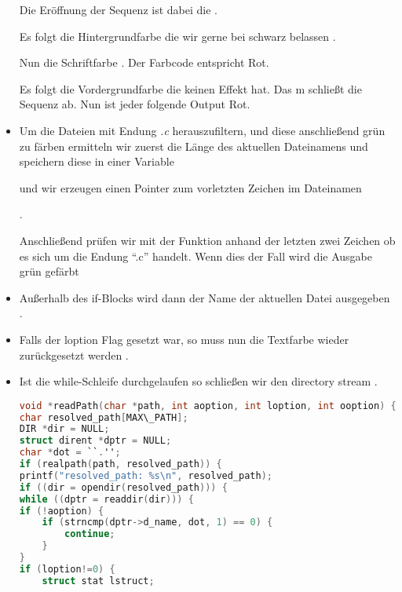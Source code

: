 \begin{itemize}
\command{printf("\\033[0;31;1m");}

Die Eröffnung der Sequenz ist dabei die \command{\\033[}.

Es folgt die Hintergrundfarbe die wir gerne bei schwarz belassen .

Nun die Schriftfarbe . Der Farbcode entspricht Rot.

Es folgt die Vordergrundfarbe  die keinen Effekt hat.
Das m schließt die Sequenz ab.
Nun ist jeder folgende Output Rot.

\item Um die Dateien mit Endung \textit{.c} herauszufiltern, und diese anschließend grün zu färben
ermitteln wir zuerst die Länge des aktuellen Dateinamens und speichern diese in einer Variable


und wir erzeugen einen Pointer zum vorletzten Zeichen im Dateinamen

.

Anschließend prüfen wir mit der Funktion 
anhand der letzten zwei Zeichen ob es sich um die Endung ``.c'' handelt.
Wenn dies der Fall wird die Ausgabe grün gefärbt \command{printf("\\033[0;32;1m");}

\item Außerhalb des if-Blocks wird dann der Name der aktuellen Datei
ausgegeben .

\item Falls der loption Flag gesetzt war, so muss nun die Textfarbe wieder
zurückgesetzt werden \command{if (loption!=0) printf("\033[0;0;0m");}.

\item Ist die while-Schleife durchgelaufen so schließen wir den directory
stream .


\begin{lstlisting}[language=C]
void *readPath(char *path, int aoption, int loption, int ooption) {
char resolved_path[MAX\_PATH];
DIR *dir = NULL;
struct dirent *dptr = NULL;
char *dot = ``.'';
if (realpath(path, resolved_path)) {
printf("resolved_path: %s\n", resolved_path);
if ((dir = opendir(resolved_path))) {
while ((dptr = readdir(dir))) {
if (!aoption) {
	if (strncmp(dptr->d_name, dot, 1) == 0) {
		continue;
	}
}
if (loption!=0) {
	struct stat lstruct;


\end{lstlisting}
\end{itemize}
